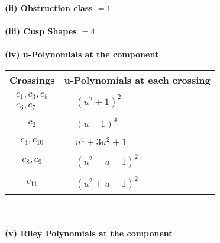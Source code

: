 \documentclass[1p]{elsarticle_modified}
\theoremstyle{definition}
\begin{document}
\flushleft \textbf{(ii) Obstruction class $= 1$}\\~\\
\flushleft \textbf{(iii) Cusp Shapes $= 4$}\\~\\
\newpage\renewcommand{\arraystretch}{1}
\flushleft \textbf{(iv) u-Polynomials at the component}\newline \\
\begin{tabular}{m{50pt}|m{274pt}}
Crossings & \hspace{64pt}u-Polynomials at each crossing \\
\hline $$\begin{aligned}c_{1},c_{3},c_{5}\\c_{6},c_{7}\end{aligned}$$&$\begin{aligned}
&(u^2+1)^2
\end{aligned}$\\
\hline $$\begin{aligned}c_{2}\end{aligned}$$&$\begin{aligned}
&(u+1)^4
\end{aligned}$\\
\hline $$\begin{aligned}c_{4},c_{10}\end{aligned}$$&$\begin{aligned}
&u^4+3 u^2+1
\end{aligned}$\\
\hline $$\begin{aligned}c_{8},c_{9}\end{aligned}$$&$\begin{aligned}
&(u^2- u-1)^2
\end{aligned}$\\
\hline $$\begin{aligned}c_{11}\end{aligned}$$&$\begin{aligned}
&(u^2+u-1)^2
\end{aligned}$\\
\hline
\end{tabular}\\~\\
\newpage\renewcommand{\arraystretch}{1}
\flushleft \textbf{(v) Riley Polynomials at the component}\newline \\
\end{document}
